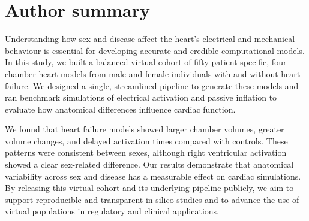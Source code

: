 \documentclass[10pt,letterpaper]{article}
\begin{document}

%
\section*{Author summary}
Understanding how sex and disease affect the heart’s electrical and mechanical behaviour is essential 
for developing accurate and credible computational models. 
In this study, we built a balanced virtual cohort of fifty patient-specific, four-chamber heart models 
from male and female individuals with and without heart failure. 
We designed a single, streamlined pipeline to generate these models and ran benchmark simulations of 
electrical activation and passive inflation to evaluate how anatomical differences influence cardiac function.

We found that heart failure models showed larger chamber volumes, greater volume changes, and 
delayed activation times compared with controls. 
These patterns were consistent between sexes, although right ventricular activation showed a clear 
sex-related difference. Our results demonstrate that anatomical variability across sex and disease 
has a measurable effect on cardiac simulations.
By releasing this virtual cohort and its underlying pipeline publicly, we aim to support reproducible and 
transparent in-silico studies and to advance the use of virtual populations in regulatory and clinical 
applications.

\linenumbers








\listoffigures
\listoftables


\listofchanges

\end{document}
